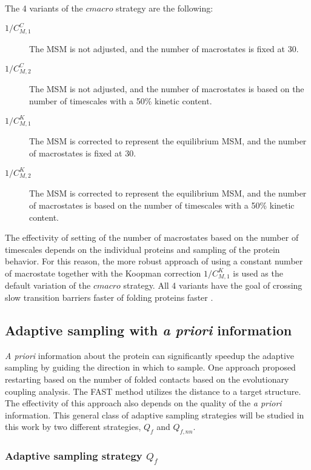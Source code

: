 The 4 variants of the $cmacro$ strategy are the following:
\begin{description}
\item[$1/C_{M,1}^C$]
The MSM is not adjusted, and the number of macrostates is fixed at 30.
\item[$1/C_{M,2}^C$]
The MSM is not adjusted, and the number of macrostates is based on the number of timescales with a 50\% kinetic content.
\item[$1/C_{M,1}^K$]
The MSM is corrected to represent the equilibrium MSM, and the number of macrostates is fixed at 30.
\item[$1/C_{M,2}^K$]
The MSM is corrected to represent the equilibrium MSM, and the number of macrostates is based on the number of timescales with a 50\% kinetic content.
\end{description}

The effectivity of setting of the number of macrostates based on the number of timescales depends on the individual proteins and sampling of the protein behavior.
For this reason, the more robust approach of using a constant number of macrostate together with the Koopman correction $1/C_{M,1}^K$ is used as the default variation of the $cmacro$ strategy.
All 4 variants have the goal of crossing slow transition barriers faster of folding proteins faster \cite{Adstrategies2018}.


\subsection{Adaptive sampling with \emph{a priori} information}

\emph{A priori} information about the protein can significantly speedup the adaptive sampling by guiding the direction in which to sample. One approach \cite{EvolutionCoupling-Shamsi2017} proposed restarting based on the number of folded contacts based on the evolutionary coupling analysis. The FAST method \cite{FAST-Bowman-2015} utilizes the distance to a target structure. The effectivity of this approach also depends on the quality of the \emph{a priori} information. This general class of adaptive sampling strategies will be studied in this work by two different strategies, $Q_{f}$  and $Q_{f,nn}$.  

\subsubsection{Adaptive sampling strategy $Q_{f}$}

